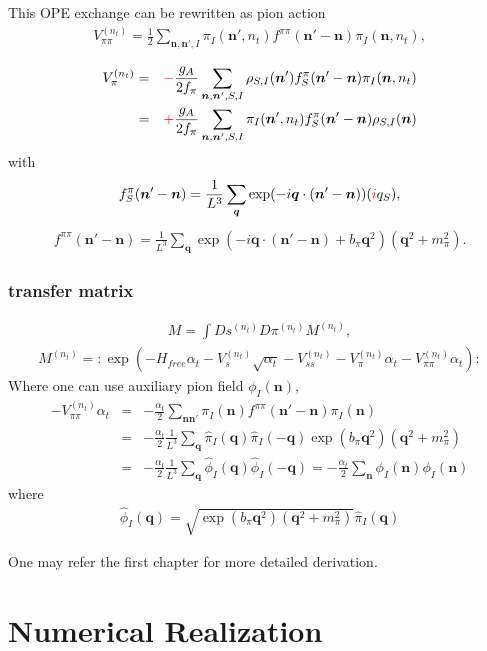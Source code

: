 \documentclass[10pt]{book}
\def\bm{\boldsymbol}
\newcommand{\bea}{\begin{eqnarray}}
\newcommand{\eea}{\end{eqnarray}}
\newcommand{\no}{\nonumber \\}
\def\vn{{\bm n}}
\def\vq{{\bm q}}
\begin{document}
This OPE exchange can be rewritten as pion action
\bea 
V_{\pi\pi}^{(n_t)}=\frac{1}{2}\sum_{\vn,\vn',I} \pi_I(\vn',n_t)f^{\pi\pi}(\vn'-\vn)\pi_I(\vn,n_t),
\eea 

\bea 
V_{\pi}^{(n_t)}&=&{\color{red}-}\frac{g_A}{2f_\pi}\sum_{\vn,\vn',S,I}\rho_{S,I}(\vn')f^\pi_S(\vn'-\vn)\pi_I(\vn,n_t)
\no 
&=&{\color{red}+}\frac{g_A}{2f_\pi}\sum_{\vn,\vn',S,I} \pi_I(\vn',n_t)f^\pi_S(\vn'-\vn)\rho_{S,I}(\vn)
\eea 
with
\bea 
f_S^\pi(\vn'-\vn)=\frac{1}{L^3}\sum_{\vq} \exp(-i\vq\cdot(\vn'-\vn))({\color{red}i}q_S),
\eea 
\bea 
f^{\pi\pi}(\vn'-\vn)=\frac{1}{L^3}\sum_\vq \exp(-i\vq\cdot(\vn'-\vn)+b_\pi\vq^2)(\vq^2+m_\pi^2).
\eea 

\subsection{transfer matrix}
\bea 
M=\int D s^{(n_t)} D\pi^{(n_t)} M^{(n_t)},
\eea 
\bea 
M^{(n_t)}=:\exp\left(-H_{free}\alpha_t-V_s^{(n_t)}\sqrt{\alpha_t}-V_{ss}^{(n_t)}
   -V_\pi^{(n_t)}\alpha_t-V_{\pi\pi}^{(n_t)}\alpha_t  \right):
\eea 
Where one can use auxiliary pion field $\phi_I(\vn)$,
\bea 
-V_{\pi\pi}^{(n_t)}\alpha_t&=&-\frac{\alpha_t}{2}\sum_{\vn \vn'}\pi_I(\vn)f^{\pi\pi}(\vn'-\vn)\pi_I(\vn) \no 
&=&-\frac{\alpha_t}{2}\frac{1}{L^3}\sum_{\vq} \hat{\pi}_I(\vq)\hat{\pi}_I(-\vq) 
\exp(b_\pi\vq^2)(\vq^2+m_\pi^2) \no 
&=& -\frac{\alpha_t}{2}\frac{1}{L^3}\sum_{\vq} \hat{\phi}_I(\vq)     \hat{\phi}_I(-\vq)
=  -\frac{\alpha_t}{2}\sum_{\vn} {\phi}_I(\vn)     {\phi}_I(\vn) 
\eea  
where
\bea 
\hat{\phi}_I(\vq)=\sqrt{\exp(b_\pi \vq^2)(\vq^2+m_\pi^2)}\hat{\pi}_I(\vq)
\eea 
 
 
One may refer the first chapter for more detailed derivation.  
\newpage


\chapter{Numerical Realization}
\end{document}
